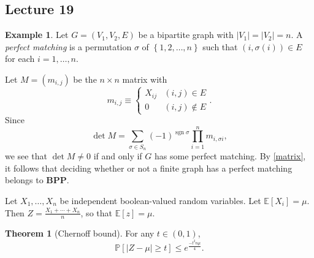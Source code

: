 \documentclass[10pt,letterpaper,cm]{nupset}
\theoremstyle{definition}
\newtheorem{exmp}[definition]{Example}
\theoremstyle{theorem}
\newtheorem{theorem}[definition]{Theorem}
\theoremstyle{remark}
\newcommand{\1}{\mathbf{1}}
\newcommand{\0}{\vec 0}
\DeclareMathOperator{\sgn}{sgn}
\begin{document}
\subsection{Lecture 19}

\begin{exmp}
Let $G=\left(V_1, V_2, E\right)$ be a bipartite graph with $\left\lvert{V_1}\right\rvert=\left\lvert{V_2}\right\rvert=n$. 
A \textit{perfect matching} is a permutation $\sigma$ of $\left\{1,2, \ldots, n\right\}$ such that $\left(i, \sigma(i)\right) \in E$ for each $i=1, \ldots, n$.

Let $M= \left(m_{i,j}\right)$ be the $n\times n$ matrix with $$m_{i,j} \equiv \begin{cases} X_{ij} & (i,j) \in E\\ 0 & (i,j) \notin E    \end{cases}.$$ Since $$\det{M} =  \sum_{\sigma \in S_n} ({-1})^{\sgn{\sigma}} \prod_{i=1}^n m_{i, \sigma{i}} ,$$ we see that $\det{M} \ne 0$ if and only if $G$ has some perfect matching. By \cref{matrix}, it follows that deciding whether or not a finite graph has a perfect matching belongs to $\mathbf{BPP}$.
\end{exmp}

\medskip

Let $X_1, \ldots, X_n$ be independent boolean-valued random variables. Let $\mathbb{E}[X_i]= \mu$. Then $Z= \frac{X_1 + \cdots + X_n}{n}$, so that $\mathbb{E}\left[z\right] = \mu$. 

\begin{theorem}[Chernoff bound]\label{Chb}
 For any $t\in (0,1)$, $$\mathbb{P}\left[\left\lvert{Z - \mu}\right\rvert \geq t\right] \leq e^{\frac{{-t^2n} \mu}{4}}.$$
\end{theorem}
\end{document}
